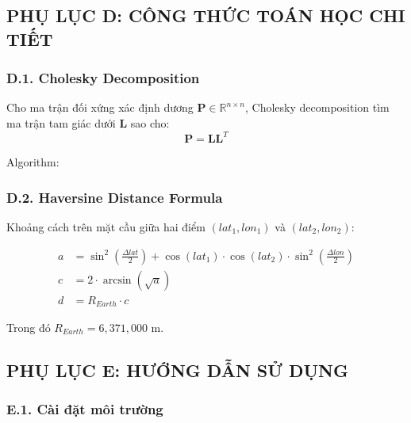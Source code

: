 \subsection*{PHỤ LỤC D: CÔNG THỨC TOÁN HỌC CHI TIẾT}

\subsubsection*{D.1. Cholesky Decomposition}

Cho ma trận đối xứng xác định dương $\mathbf{P} \in \mathbb{R}^{n \times n}$, Cholesky decomposition tìm ma trận tam giác dưới $\mathbf{L}$ sao cho:
\begin{equation}
\mathbf{P} = \mathbf{L}\mathbf{L}^T
\end{equation}

Algorithm:
\begin{algorithm}[H]
\end{algorithm}

\subsubsection*{D.2. Haversine Distance Formula}

Khoảng cách trên mặt cầu giữa hai điểm $(lat_1, lon_1)$ và $(lat_2, lon_2)$:

\begin{align}
a &= \sin^2\left(\frac{\Delta lat}{2}\right) + \cos(lat_1) \cdot \cos(lat_2) \cdot \sin^2\left(\frac{\Delta lon}{2}\right) \\
c &= 2 \cdot \arcsin(\sqrt{a}) \\
d &= R_{Earth} \cdot c
\end{align}

Trong đó $R_{Earth} = 6,371,000$ m.

\subsection*{PHỤ LỤC E: HƯỚNG DẪN SỬ DỤNG}

\subsubsection*{E.1. Cài đặt môi trường}

